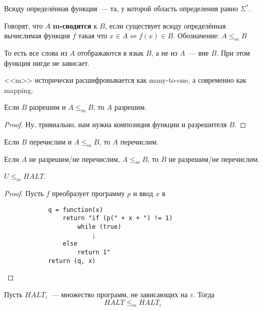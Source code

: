 \documentclass{article}
\begin{document}
    \begin{definition}
        Всюду определённая функция~--- та, у которой область определения равно $\Sigma^*$.
    \end{definition}
    \begin{definition}
        Говорят, что $A$ \textbf{m-сводится} к $B$, если существует всюду определённая вычислимая функция $f$ такая что $x\in A\Leftrightarrow f(x)\in B$. Обозначение: $A\leqslant_mB$
    \end{definition}
    \begin{remark}
        То есть все слова из $A$ отображаются в язык $B$, а не из $A$~--- вне $B$. При этом функция нигде не зависает.
    \end{remark}
    \begin{remark}
        <<m>> исторически расшифровывается как many-to-one, а современно как mapping.
    \end{remark}
    \begin{theorem}
        Если $B$ разрешим и $A\leqslant_m B$, то $A$ разрешим.
    \end{theorem}
    \begin{proof}
        Ну, тривиально, нам нужна композиция функции и разрешителя $B$.
    \end{proof}
    \begin{theorem}
        Если $B$ перечислим и $A\leqslant_m B$, то $A$ перечислим.
    \end{theorem}
    \begin{theorem}
        Если $A$ не разрешим/не перечислим, $A\leqslant_m B$, то $B$ не разрешим/не перечислим.
    \end{theorem}
    \begin{theorem}
        $U\leqslant_m HALT$.
    \end{theorem}
    \begin{proof}
        Пусть $f$ преобразует программу $p$ и ввод $x$ в
        \begin{verbatim}
            q = function(x)
                return "if (p(" + x + ") != 1)
                    while (true)
                        ;
                else
                    return 1"
            return (q, x)
        \end{verbatim}
    \end{proof}
    \begin{claim}
        Пусть $HALT_\varepsilon$~--- множество программ, не зависающих на $\varepsilon$. Тогда
        $$
        HALT\leqslant_mHALT_\varepsilon
        $$
    \end{claim}
\end{document}
